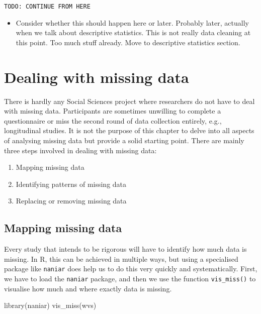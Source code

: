 \documentclass[
]{book}
\newenvironment{Shaded}{\begin{snugshade}}{\end{snugshade}}
\newcommand{\FunctionTok}[1]{\textcolor[rgb]{0.00,0.00,0.00}{#1}}
\newcommand{\NormalTok}[1]{#1}
\providecommand{\tightlist}{%
  \setlength{\itemsep}{0pt}\setlength{\parskip}{0pt}}
\begin{document}
\texttt{TODO:\ CONTINUE\ FROM\ HERE}

\begin{itemize}
\tightlist
\item
  Consider whether this should happen here or later. Probably later, actually when we talk about descriptive statistics. This is not really data cleaning at this point. Too much stuff already. Move to descriptive statistics section.
\end{itemize}

\hypertarget{dealing-with-missing-data}{%
\section{Dealing with missing data}\label{dealing-with-missing-data}}

There is hardly any Social Sciences project where researchers do not have to deal with missing data. Participants are sometimes unwilling to complete a questionnaire or miss the second round of data collection entirely, e.g., longitudinal studies. It is not the purpose of this chapter to delve into all aspects of analysing missing data but provide a solid starting point. There are mainly three steps involved in dealing with missing data:

\begin{enumerate}
\def\labelenumi{\arabic{enumi}.}
\item
  Mapping missing data
\item
  Identifying patterns of missing data
\item
  Replacing or removing missing data
\end{enumerate}

\hypertarget{mapping-missing-data}{%
\subsection{Mapping missing data}\label{mapping-missing-data}}

Every study that intends to be rigorous will have to identify how much data is missing. In R, this can be achieved in multiple ways, but using a specialised package like \texttt{naniar} does help us to do this very quickly and systematically. First, we have to load the \texttt{naniar} package, and then we use the function \texttt{vis\_miss()} to visualise how much and where exactly data is missing.

\begin{Shaded}
\begin{Highlighting}[]
\FunctionTok{library}\NormalTok{(naniar)}
\FunctionTok{vis\_miss}\NormalTok{(wvs)}
\end{Highlighting}
\end{Shaded}
\end{document}
